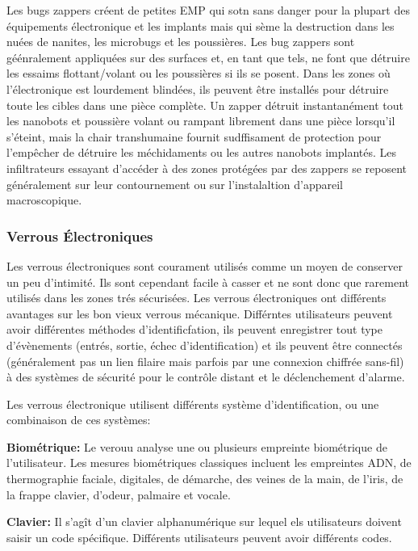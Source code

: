 Les bugs zappers créent de petites EMP qui sotn sans danger pour la plupart des équipements électronique et les implants mais qui sème la destruction dans les nuées de nanites, les microbugs et les poussières. Les bug zappers sont géénralement appliquées sur des surfaces et, en tant que tels, ne font que détruire les essaims flottant/volant ou les poussières si ils se posent. Dans les zones où l'électronique est lourdement blindées, ils peuvent être installés pour détruire toute les cibles dans une pièce complète. Un zapper détruit instantanément tout les nanobots et poussière volant ou rampant librement dans une pièce lorsqu'il s'éteint, mais la chair transhumaine fournit sudffisament de protection pour l'empêcher de détruire les méchidaments ou les autres nanobots implantés. Les infiltrateurs essayant d'accéder à des zones protégées par des zappers se reposent généralement  sur leur contournement ou sur l'instalaltion d'appareil macroscopique. 

\subsubsection{Verrous Électroniques} 

Les verrous électroniques sont courament utilisés comme un moyen de conserver un peu d'intimité. Ils sont cependant facile à casser et ne sont donc que rarement utilisés dans les zones trés sécurisées. Les verrous électroniques ont différents avantages sur les bon vieux verrous mécanique. Différntes utilisateurs peuvent avoir différentes méthodes d'identificfation, ils peuvent enregistrer tout type d'évènements (entrés, sortie, échec d'identification) et ils peuvent être connectés (généralement pas un lien filaire mais parfois par une connexion chiffrée sans-fil) à des systèmes de sécurité pour le contrôle distant et le déclenchement d'alarme. 

Les verrous électronique utilisent différents système d'identification, ou une combinaison de ces systèmes: 

\textbf{Biométrique:} Le verouu analyse une ou plusieurs empreinte biométrique de l'utilisateur. Les mesures biométriques classiques incluent les empreintes ADN, de thermographie faciale, digitales, de démarche, des veines de la main, de l'iris, de la frappe clavier, d'odeur, palmaire et vocale. 

\textbf{Clavier:} Il s'agît d'un clavier alphanumérique sur lequel els utilisateurs doivent saisir un code spécifique. Différents utilisateurs peuvent avoir différents codes. 


